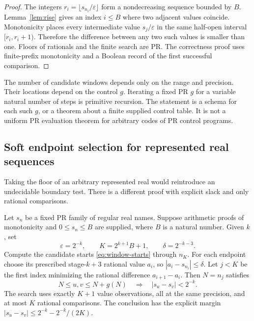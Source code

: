 \begin{proof}
The integers \(r_i=\lfloor s_{n_i}/\varepsilon\rfloor\) form a
nondecreasing sequence bounded by \(B\).  Lemma~\ref{lem:rise} gives
an index \(i\le B\) where two adjacent values coincide.  Monotonicity
places every intermediate value \(s_j/\varepsilon\) in the same
half-open interval \([r_i,r_i+1)\).  Therefore the difference between
any two such values is smaller than one.  Floors of rationals and the
finite search are PR.  The correctness proof uses finite-prefix
monotonicity and a Boolean record of the first successful comparison.
\end{proof}

The number of candidate windows depends only on the range and precision.
Their locations depend on the control \(g\).  Iterating a fixed PR
\(g\) for a variable natural number of steps is primitive recursion.
The statement is a schema for each such \(g\), or a theorem about a
finite supplied control table.  It is not a uniform PR evaluation
theorem for arbitrary codes of PR control programs.

\subsection{Soft endpoint selection for represented real sequences}

Taking the floor of an arbitrary represented real would reintroduce an
undecidable boundary test.  There is a different proof with explicit
slack and only rational comparisons.

\begin{theorem}\label{thm:real-window}
Let \(s_n\) be a fixed PR family of regular real names.  Suppose arithmetic
proofs of monotonicity and \(0\le s_n\le B\) are supplied, where
\(B\) is a natural number.  Given \(k\), set
\[
 \varepsilon=2^{-k},\qquad
 K=2^{k+1}B+1,\qquad \delta=2^{-k-3}.
\]
Compute the candidate starts \eqref{eq:window-starts} through \(n_K\).
For each endpoint choose its prescribed stage-\(k+3\) rational value
\(a_i\), so \(|a_i-s_{n_i}|\le\delta\).  Let \(j<K\) be the first
index minimizing the rational difference \(a_{i+1}-a_i\).
Then \(N=n_j\) satisfies
\[
 N\le u,v\le N+g(N)
 \quad\Longrightarrow\quad |s_u-s_v|<2^{-k}.
\]
The search uses exactly \(K+1\) value observations, all at the same
precision, and at most \(K\) rational comparisons.  The conclusion has
the explicit margin
\( |s_u-s_v|\le2^{-k}-2^{-k}/(2K)\).
\end{theorem}

